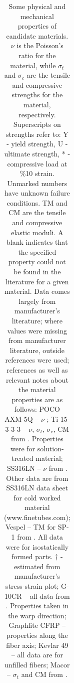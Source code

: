 \documentclass[final]{svjour2}
\begin{document}
\begin{table}[htb]
\begin{threeparttable}
\begin{tabular}{lrrrrrr}
 \bottomrule
\end{tabular}
\caption{Some physical and mechanical properties of candidate materials. $\nu$ is the Poisson's ratio for the material, while $\sigma_{t}$ and $\sigma_{c}$ are the tensile and compressive strengths for the material, respectively. Superscripts on strengths refer to: Y - yield strength, U - ultimate strength, * - compressive load at \%10 strain. Unmarked numbers have unknown failure conditions. TM and CM are the tensile and compressive elastic moduli. A blank indicates that the specified property could not be found in the literature for a given material. Data comes largely from manufacturer's literature; where values were missing from manufacturer literature, outside references were used; references as well as relevant notes about the material properties are as follows: POCO AXM-5Q -- $\nu$ \cite{Swank2009}; Ti 15-3-3-3 -- $\nu$, $\sigma_t$, $\sigma_c$, CM from \cite{Lang2001}\cite{Johnson1996}\cite{Nyakana2005}. Properties were for solution-treated material; SS316LN -- $\nu$ from \cite{Shankar2001}. Other data are from SS316LN data sheet for cold worked material (www.finetubes.com); Vespel -- TM for SP-1 from \cite{Doty1981}. All data were for isostatically formed parts. $\dag$ - estimated from manufacturer's stress-strain plot; G-10CR -- all data from \cite{Kasen1981}\cite{Markley1985}. Properties taken in the warp direction; Graphlite CFRP -- properties along the fiber axis; Kevlar 49 -- all data are for unfilled fibers; Macor -- $\sigma_t$ and CM from \cite{Markley1985}\cite{websiteMacor}.}
\label{SW}
\end{threeparttable}
\end{table}
\end{document}
